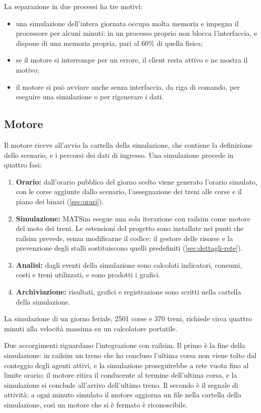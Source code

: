 La separazione in due processi ha tre motivi:
\begin{itemize}
	\item una simulazione dell'intera giornata occupa molta memoria e impegna il processore per alcuni minuti: in un processo proprio non blocca l'interfaccia, e dispone di una memoria propria, pari al 60\% di quella fisica;
	\item se il motore si interrompe per un errore, il client resta attivo e ne mostra il motivo;
	\item il motore si può avviare anche senza interfaccia, da riga di comando, per eseguire una simulazione o per rigenerare i dati.
\end{itemize}

\subsection{Motore}
Il motore riceve all'avvio la cartella della simulazione, che contiene la definizione dello scenario, e i percorsi dei dati di ingresso. Una simulazione procede in quattro fasi:
\begin{enumerate}
	\item \textbf{Orario:} dall'orario pubblico del giorno scelto viene generato l'orario simulato, con le corse aggiunte dallo scenario, l'assegnazione dei treni alle corse e il piano dei binari (\cref{sec:orari}).
	\item \textbf{Simulazione:} MATSim esegue una sola iterazione con railsim come motore del moto dei treni. Le estensioni del progetto sono installate nei punti che railsim prevede, senza modificarne il codice: il gestore delle risorse e la prevenzione degli stalli sostituiscono quelli predefiniti (\cref{sec:dettagli-rete}).
	\item \textbf{Analisi:} dagli eventi della simulazione sono calcolati indicatori, consumi, costi e treni utilizzati, e sono prodotti i grafici.
	\item \textbf{Archiviazione:} risultati, grafici e registrazione sono scritti nella cartella della simulazione.
\end{enumerate}
La simulazione di un giorno feriale, 2501 corse e 370 treni, richiede circa quattro minuti alla velocità massima su un calcolatore portatile.

Due accorgimenti riguardano l'integrazione con railsim. Il primo è la fine della simulazione: in railsim un treno che ha concluso l'ultima corsa non viene tolto dal conteggio degli agenti attivi, e la simulazione proseguirebbe a rete vuota fino al limite orario; il motore ritira il conducente al termine dell'ultima corsa, e la simulazione si conclude all'arrivo dell'ultimo treno. Il secondo è il segnale di attività: a ogni minuto simulato il motore aggiorna un file nella cartella della simulazione, così un motore che si è fermato è riconoscibile.

